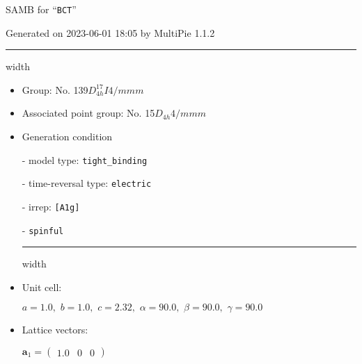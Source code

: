\documentclass[fleqn,10pt,landscape]{article}
\begin{document}
\setcounter{MaxMatrixCols}{16}

\setlength{\baselineskip}{16pt}
\footnotesize
\begin{center}
\LARGE
SAMB for ``\texttt{BCT}''
\end{center}
\begin{flushright}
Generated on 2023-06-01 18:05 by MultiPie 1.1.2
\end{flushright}
\vspace{1cm}


 \hfil \hrule height 1mm width \textwidth \hfil

\begin{itemize}
\item Group: No. 139\quad$D_{4h}^{17}$\quad$I4/mmm$\quad[ tetragonal ]

\item Associated point group: No. 15\quad$D_{4h}$\quad$4/mmm$\quad[ tetragonal ]

\vspace{5mm}

\item Generation condition

\quad - model type: \texttt{tight_binding}

\quad - time-reversal type: \texttt{electric}

\quad - irrep: \texttt{[A1g]}

\quad - \texttt{spinful}


 \hfil \hrule height 1mm width \textwidth \hfil

\item Unit cell:

\quad $a=1.0,\,\, b=1.0,\,\, c=2.32,\,\, \alpha=90.0,\,\, \beta=90.0,\,\, \gamma=90.0$

\item Lattice vectors:

\quad $\bm{a}_1=\begin{pmatrix} 1.0 & 0 & 0 \end{pmatrix}$


\end{itemize}
\end{document}

